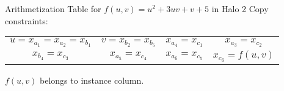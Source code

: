 \documentclass{beamer}
\begin{document}
\begin{frame}{Arithmetization Table for $f(u, v) = u^2 + 3uv + v + 5$ in Halo 2}
		Copy constraints:
		\begin{tabular}{cccc}
			$u = x_{a_1} = x_{a_2} = x_{b_1}$ & $v = x_{b_2} = x_{b_5}$ &$x_{a_4} = x_{c_1}$ & $x_{a_3} = x_{c_2}$\\ 
			$x_{b_4} = x_{c_3}$ & $x_{a_5} = x_{c_4}$ & $x_{a_6} = x_{c_5}$ & $x_{c_6} = f(u,v)$
		\end{tabular}
		
		$f(u, v)$ belongs to instance column.
	\end{frame}
	\begin{comment}
	\section{Circuit Specification}
	\begin{frame}{Problem Statement}
		Let $\mathcal{C}$ be a program computing a function, e.g., $$f(u, v) = u^2 + 3uv + v + 5.$$
		Construct a zkSNARK for satisfaction of 
		\begin{equation*}
			\mathcal{C}(\mathbf{x}) = \mathbf{y}
		\end{equation*}
		where $\mathbf{x}$ is private while $\mathcal{C}$ and $\mathbf{y}$ are public.
	\end{frame}

	\begin{frame}{Overview of Arithmetization}
		Arithmetization: transforming program to a form that can be compiled into zk proofs.
		
		Other intuition: representing such program in some language.
		
		This talk: 
		\begin{itemize}
			\item PLONK's arithmetization \cite{iacr/GabizonWC19} and 
			\item Halo 2's PLONKish \footnote{\url{https://zcash.github.io/halo2/concepts/arithmetization.html}}.
		\end{itemize}
	\end{frame}

	\begin{frame}{Circuit Specification}
		Let $\mathcal{C}$ be a circuit of $n$ gates, including:
		\begin{itemize}
			\item Additions,
			\item Multiplications,
			\item Additions with constants, and 
			\item Multiplications with constants.
		\end{itemize}
		Computations are in some finite field $\mathbb{F}$.
		

\end{comment}
\end{document}
